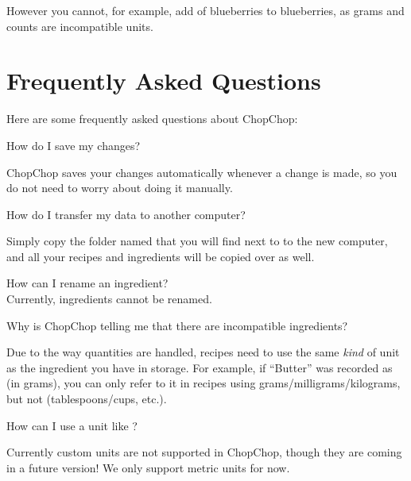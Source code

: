 	However you cannot, for example, add  of blueberries to  blueberries, as grams and counts are incompatible units.





\pagebreak
\hypertarget{FAQ}{}
\section{Frequently Asked Questions}

Here are some frequently asked questions about ChopChop:


\tabto{2em} How do I save my changes? \\[1.2em]
\tabto{2em} \parbox{.95\textwidth}{ChopChop saves your changes automatically whenever a change is made, so you do not need
					to worry about doing it manually.}

\vspace{1em}
\tabto{2em} How do I transfer my data to another computer? \\[1.2em]
\tabto{2em} \parbox{.95\textwidth}{Simply copy the folder named  that you will find next to 
					to the new computer, and all your recipes and ingredients will be copied over as well.}

\vspace{1em}
\tabto{2em} How can I rename an ingredient? \\[.4em]
\tabto{2em} Currently, ingredients cannot be renamed.

\vspace{1em}
\tabto{2em} Why is ChopChop telling me that there are incompatible ingredients? \\[2.1em]
\tabto{2em} \parbox{.95\textwidth}{Due to the way quantities are handled, recipes need to use the same \emph{kind} of unit
					as the ingredient you have in storage. For example, if \enquote{Butter} was recorded as  (in grams),
					you can only refer to it in recipes using grams/milligrams/kilograms, but not  (tablespoons/cups, etc.).}

\vspace{1em}
\tabto{2em} How can I use a unit like ? \\[1.2em]
\tabto{2em} \parbox{.95\textwidth}{Currently custom units are not supported in ChopChop, though they are coming in a future
					version! We only support metric units for now.}


